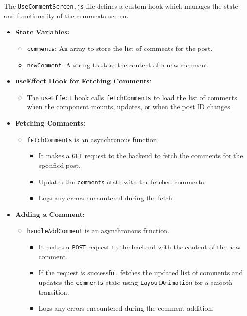 The \texttt{UseCommentScreen.js} file defines a custom hook which manages the state and functionality of the comments screen.

\begin{itemize}
    \item \textbf{State Variables:}
    \begin{itemize}
        \item \texttt{comments}: An array to store the list of comments for the post.
        \item \texttt{newComment}: A string to store the content of a new comment.
    \end{itemize}

    \item \textbf{useEffect Hook for Fetching Comments:}
    \begin{itemize}
        \item The \texttt{useEffect} hook calls \texttt{fetchComments} to load the list of comments when the component mounts, updates, or when the post ID changes.
    \end{itemize}

    \item \textbf{Fetching Comments:}
    \begin{itemize}
        \item \texttt{fetchComments} is an asynchronous function.
        \begin{itemize}
            \item It makes a \texttt{GET} request to the backend to fetch the comments for the specified post.
            \item Updates the \texttt{comments} state with the fetched comments.
            \item Logs any errors encountered during the fetch.
        \end{itemize}
    \end{itemize}

    \item \textbf{Adding a Comment:}
    \begin{itemize}
        \item \texttt{handleAddComment} is an asynchronous function.
        \begin{itemize}
            \item It makes a \texttt{POST} request to the backend with the content of the new comment.
            \item If the request is successful, fetches the updated list of comments and updates the \texttt{comments} state using \texttt{LayoutAnimation} for a smooth transition.
            \item Logs any errors encountered during the comment addition.
        \end{itemize}
    \end{itemize}


\end{itemize}
